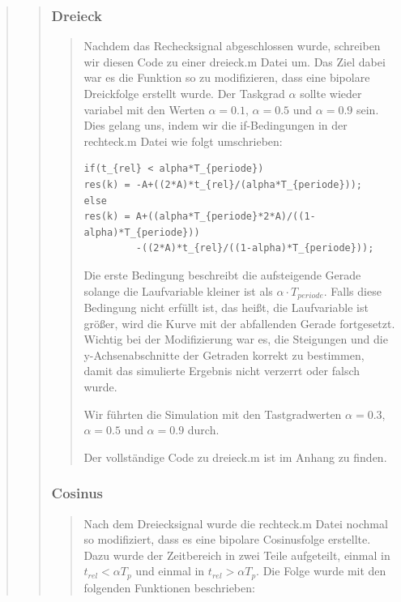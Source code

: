 \begin{quote}
\begin{quote}
\begin{quote}
            \end{quote}
            
            \subsubsection{Dreieck}
            \begin{quote}
                Nachdem das Rechecksignal abgeschlossen wurde, schreiben wir diesen Code zu
                einer dreieck.m Datei um. Das Ziel dabei war es die Funktion so zu
                modifizieren, dass eine bipolare Dreickfolge erstellt wurde. Der Taskgrad
                $\alpha$ sollte wieder variabel mit den Werten $\alpha = 0.1$, $\alpha = 0.5$
                und $\alpha = 0.9$ sein. Dies gelang uns, indem wir die if-Bedingungen in der
                rechteck.m Datei wie folgt umschrieben:
    
\begin{lstlisting}
if(t_{rel} < alpha*T_{periode})
res(k) = -A+((2*A)*t_{rel}/(alpha*T_{periode}));
else
res(k) = A+((alpha*T_{periode}*2*A)/((1-alpha)*T_{periode}))
         -((2*A)*t_{rel}/((1-alpha)*T_{periode}));
\end{lstlisting}  
                
                \vspace{1em}
                
                Die erste Bedingung beschreibt die aufsteigende Gerade solange die
                Laufvariable kleiner ist als $\alpha \cdot T_{periode}$. Falls diese Bedingung
                nicht erfüllt ist, das heißt, die Laufvariable ist größer, wird die Kurve mit
                der abfallenden Gerade fortgesetzt. Wichtig bei der Modifizierung war es, die Steigungen 
                und die y-Achsenabschnitte der Getraden korrekt zu bestimmen, damit das
                simulierte Ergebnis nicht verzerrt oder falsch wurde.
                
                Wir führten die Simulation mit den Tastgradwerten $\alpha = 0.3$, $\alpha = 0.5$
                und $\alpha = 0.9$ durch.
                
                Der vollständige Code zu dreieck.m ist im Anhang zu finden.
                
            \end{quote}
            
            \subsubsection{Cosinus}
            \begin{quote}
                Nach dem Dreiecksignal wurde die rechteck.m Datei nochmal so modifiziert, dass
                es eine bipolare Cosinusfolge erstellte.
                Dazu wurde der Zeitbereich in zwei Teile aufgeteilt, einmal in $t_{rel} <
                \alpha T_p$ und einmal in $t_{rel} > \alpha T_p$. Die Folge wurde mit den
                folgenden Funktionen beschrieben:\\
            

\end{quote}
\end{quote}
\end{quote}
